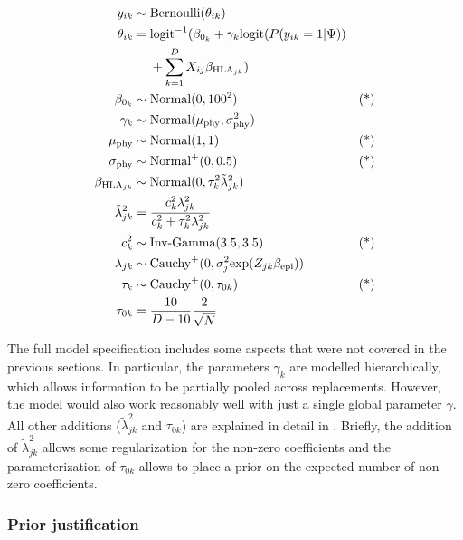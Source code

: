 \documentclass{bioinfo}
\begin{document}
\begin{methods}
\begin{equation}
  \label{eq:full}
  \begin{aligned}
   y_{ik} &\sim \text{Bernoulli}(\theta_{ik}) &\\
   \theta_{ik} &=
        \text{logit}^{-1}(\beta_{0_{k}} + \gamma_{k}\text{logit}(P(y_{ik}=1|\Psi)) & \\
        \hspace{-6cm} &~~~~ +\sum_{k=1}^{D}X_{ij}\beta_{\text{HLA}_{jk}}) & \\
    \beta_{0_{k}} &\sim \text{Normal}(0, 100^2) & \text{(*)}\\
   \gamma_{k} &\sim \text{Normal}(\mu_{\text{phy}}, \sigma_{\text{phy}}^2) & \\
    \mu_{\text{phy}} &\sim \text{Normal}(1, 1) & \text{(*)} \\
   \sigma_{\text{phy}} &\sim \text{Normal}^{+}(0, 0.5) & \text{(*)} \\
   \beta_{\text{HLA}_{jk}} &\sim \text{Normal}(0, \tau_{k}^{2}\tilde{\lambda}^{2}_{jk}) & \\
   \tilde{\lambda}^{2}_{jk} &= \frac{c_{k}^{2}\lambda_{jk}^{2}}{c_{k}^{2} + \tau_{k}^{2}\lambda_{jk}^{2}} & \\
    c_{k}^2 &\sim \text{Inv-Gamma}(3.5, 3.5) & \text{(*)} \\
   \lambda_{jk} &\sim \text{Cauchy}^{+}(0, \sigma_{j}^2\text{exp}(Z_{jk}\beta_{\text{epi}})) & \\
   \tau_{k} &\sim \text{Cauchy}^{+}(0, \tau_{0k}) & \text{(*)} \\
   \tau_{0k} &= \frac{10}{D-10}\frac{2}{\sqrt{N}} & \\
  \end{aligned}
\end{equation}

The full model specification includes some aspects that were not covered in the previous sections. In particular, the parameters \(\gamma_{k}\) are modelled hierarchically, which allows information to be partially pooled across replacements. However, the model would also work reasonably well with just a single global parameter \(\gamma\). All other additions (\(\tilde{\lambda}_{jk}^{2}\) and \(\tau_{0k}\)) are explained in detail in \citep{Piironen2017}. Briefly, the addition of  \(\tilde{\lambda}_{jk}^{2}\) allows some regularization for the non-zero coefficients and the parameterization of \(\tau_{0k}\) allows to place a prior on the expected number of non-zero coefficients.

\subsubsection{Prior justification}


\end{methods}
\end{document}
